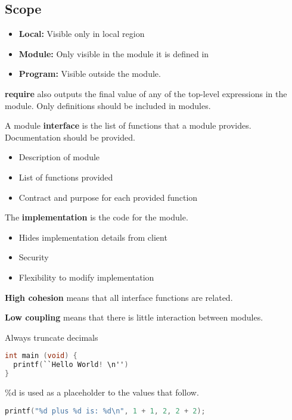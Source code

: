 \documentclass[english, 12pt]{article}
\begin{document}
\subsection{Scope}
\begin{itemize}
\item \textbf{Local:} Visible only in local region
\item \textbf{Module:} Only visible in the module it is defined in
\item \textbf{Program:} Visible outside the module.
\end{itemize}
\begin{qte}
\textbf{require} also outputs the final value of any of the top-level expressions in the module. Only definitions should be included in modules.
\end{qte}
\begin{defn}
A module \textbf{interface} is the list of functions that a module provides. Documentation should be provided.
\begin{itemize}
\item Description of module
\item List of functions provided
\item Contract and purpose for each provided function
\end{itemize}
\end{defn}
\begin{defn}
The \textbf{implementation} is the code for the module.
\begin{itemize}
\item Hides implementation details from client
\item Security
\item Flexibility to modify implementation
\end{itemize}
\end{defn}

\begin{defn}
\textbf{High cohesion} means that all interface functions are related.
\end{defn}
\begin{defn}
\textbf{Low coupling} means that there is little interaction between modules.
\end{defn}

\begin{qte}
Always truncate decimals
\end{qte}



\begin{lstlisting}[language=C]
int main (void) {
  printf(``Hello World! \n'')
}
\end{lstlisting}


\begin{defn}
\%d is used as a placeholder to the values that follow.
\begin{lstlisting}[language=C]
printf("%d plus %d is: %d\n", 1 + 1, 2, 2 + 2);
\end{lstlisting}
\end{defn}
\end{document}
